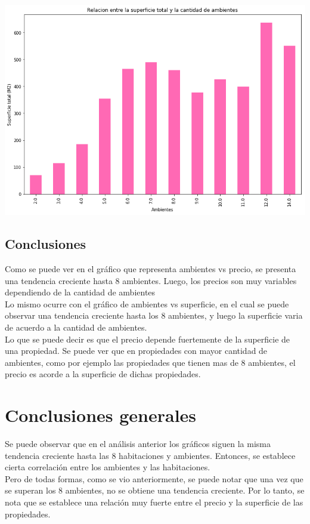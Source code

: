 \documentclass[a4paper, 10pt]{article}
\begin{document}
					\begin{center}    		
    					\includegraphics[width=\textwidth]{images/RelAmbSup}    				
					\end{center}
					
				\subsection{Conclusiones}
					
					Como se puede ver en el gráfico que representa ambientes vs precio, se presenta una tendencia creciente hasta 8 ambientes. Luego, los precios son muy variables dependiendo de la cantidad de ambientes
					\\
					Lo mismo ocurre con el gráfico de ambientes vs superficie, en el cual se puede observar una tendencia creciente hasta los 8 ambientes, y luego la superficie varia de acuerdo a la cantidad de ambientes.
					\\
					Lo que se puede decir es que el precio depende fuertemente de la superficie de una propiedad. Se puede ver que en propiedades con mayor cantidad de ambientes, como por ejemplo las propiedades que tienen mas de 8 ambientes, el precio es acorde a la superficie de dichas propiedades.
			
			\section{ Conclusiones generales }
				
				Se puede observar que en el análisis anterior los gráficos siguen la misma tendencia creciente hasta las 8 habitaciones y ambientes. Entonces, se establece cierta correlación entre los ambientes y las habitaciones. 
				\\
				Pero de todas formas, como se vio anteriormente, se puede notar que una vez que se superan los 8 ambientes, no se obtiene una tendencia creciente. Por lo tanto, se nota que se establece una relación muy fuerte entre el precio y la superficie de las propiedades.
\end{document}
